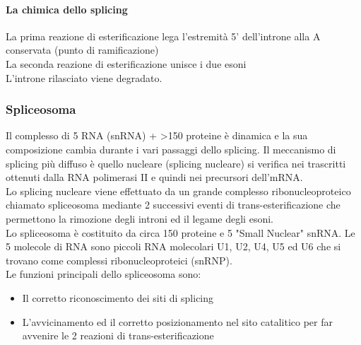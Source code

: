 \documentclass{article}
\begin{document}
\paragraph{La chimica dello splicing}
La prima reazione di esterificazione lega l'estremità 5' dell'introne alla A conservata (punto di ramificazione)\\
La seconda reazione di esterificazione unisce i due esoni\\
L'introne rilasciato viene degradato.
\subsubsection{Spliceosoma}
Il complesso di 5 RNA (snRNA) + >150 proteine è dinamica e la sua composizione cambia durante i vari passaggi dello splicing.
Il meccanismo di splicing più diffuso è quello nucleare (splicing nucleare) si verifica nei trascritti ottenuti dalla
RNA polimerasi II e quindi nei precursori dell'mRNA.\\
Lo splicing nucleare viene effettuato da un grande complesso ribonucleoproteico chiamato
spliceosoma mediante 2 successivi eventi di trans-esterificazione che permettono la rimozione degli introni ed il legame degli esoni.\\
Lo spliceosoma è costituito da circa 150 proteine e 5 "Small Nuclear" snRNA. Le 5 molecole di RNA sono piccoli RNA molecolari U1, U2, U4, U5 ed U6 che si
trovano come complessi ribonucleoproteici (snRNP).\\
Le funzioni principali dello spliceosoma sono:
\begin{itemize}
    \item Il corretto riconoscimento dei siti di splicing
    \item L'avvicinamento ed il corretto posizionamento nel sito catalitico per far avvenire le 2 reazioni di trans-esterificazione
\end{itemize}
\end{document}
